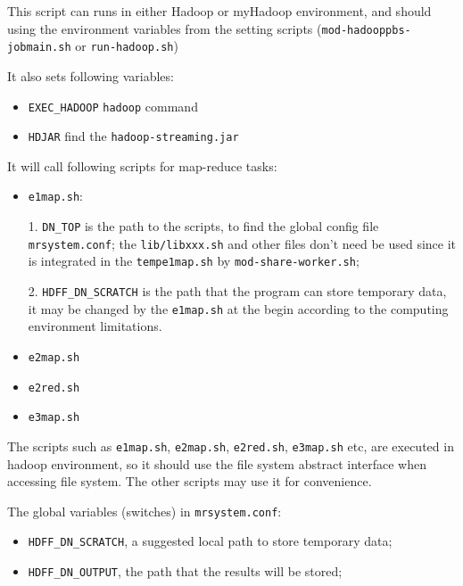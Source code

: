 \begin{itemize}
\begin{itemize}
\begin{itemize}
          This script can runs in either Hadoop or myHadoop environment, and should using the environment variables from the setting scripts (\texttt{mod-hadooppbs-jobmain.sh} or \texttt{run-hadoop.sh})

          It also sets following variables:
            \begin{itemize}
              \item \texttt{EXEC\_HADOOP} \texttt{hadoop} command
              \item \texttt{HDJAR} find the \texttt{hadoop-streaming.jar}
            \end{itemize}


          It will call following scripts for map-reduce tasks:
            \begin{itemize}
              \item \texttt{e1map.sh}:

                1. \texttt{DN\_TOP} is the path to the scripts, to find the global config file \texttt{mrsystem.conf}; the \texttt{lib/libxxx.sh} and other files don't need be used since it is integrated in the \texttt{tempe1map.sh} by \texttt{mod-share-worker.sh};

                2. \texttt{HDFF\_DN\_SCRATCH} is the path that the program can store temporary data, it may be changed by the \texttt{e1map.sh} at the begin according to the computing environment limitations.

              \item \texttt{e2map.sh}
              \item \texttt{e2red.sh}
              \item \texttt{e3map.sh}
            \end{itemize}
        \end{itemize}

    \end{itemize}

\end{itemize}



The scripts such as \texttt{e1map.sh}, \texttt{e2map.sh}, \texttt{e2red.sh}, \texttt{e3map.sh} etc,
are executed in hadoop environment, so it should use the file system abstract interface when accessing file system.
The other scripts may use it for convenience.



The global variables (switches) in \texttt{mrsystem.conf}:
\begin{itemize}
  \item \texttt{HDFF\_DN\_SCRATCH}, a suggested local path to store temporary data;

  \item \texttt{HDFF\_DN\_OUTPUT}, the path that the results will be stored;
\end{itemize}



